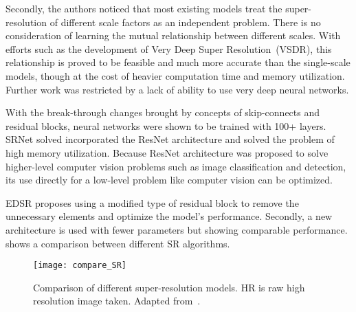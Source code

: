 Secondly, the authors noticed that most existing models treat the super-resolution of different scale factors as an independent problem. There is no consideration of learning the mutual relationship between different scales. With efforts such as the development of Very Deep Super Resolution~(VSDR), this relationship is proved to be feasible and much more accurate than the single-scale models, though at the cost of heavier computation time and memory utilization. Further work was restricted by a lack of ability to use very deep neural networks.

With the break-through changes brought by concepts of skip-connects and residual blocks, neural networks were shown to be trained with 100+ layers. SRNet solved incorporated the ResNet architecture and solved the problem of high memory utilization. Because ResNet architecture was proposed to solve higher-level computer vision problems such as image classification and detection, its use directly for a low-level problem like computer vision can be optimized.

EDSR proposes using a modified type of residual block to remove the unnecessary elements and optimize the model's performance. Secondly, a new architecture is used with fewer parameters but showing comparable performance.  shows a comparison between different SR algorithms.

\begin{figure}[h!]
  \centering
  \texttt{[image: compare\_SR]}
  \caption[Comparison of different super-resolution models]{Comparison of different super-resolution models. HR is raw high resolution image taken. Adapted from~\cite{EDSR}.}
  \label{fig:compare_SR}
\end{figure}
